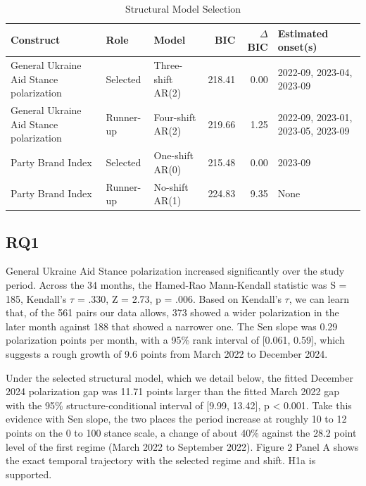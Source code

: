 \begin{table}[htbp]
\centering
\small
\begin{threeparttable}
\caption{Structural Model Selection}
\label{tab:5}
\begin{tabularx}{\textwidth}{@{}L{1.15}L{0.60}L{0.90}rrL{1.05}@{}}
\toprule
\textbf{Construct} & \textbf{Role} & \textbf{Model} & \textbf{BIC} & \textbf{$\Delta$BIC} & \textbf{Estimated onset(s)} \\
\midrule
General Ukraine Aid Stance polarization & Selected & Three-shift AR(2) & 218.41 & 0.00 & 2022-09, 2023-04, 2023-09 \\
General Ukraine Aid Stance polarization & Runner-up & Four-shift AR(2) & 219.66 & 1.25 & 2022-09, 2023-01, 2023-05, 2023-09 \\
Party Brand Index & Selected & One-shift AR(0) & 215.48 & 0.00 & 2023-09 \\
Party Brand Index & Runner-up & No-shift AR(1) & 224.83 & 9.35 & None \\
\bottomrule
\end{tabularx}
\end{threeparttable}
\end{table}


\subsection{RQ1}

General Ukraine Aid Stance polarization increased significantly over the study period. Across the 34 months, the Hamed-Rao Mann-Kendall statistic was S = 185, Kendall's $\tau$ = .330, Z = 2.73, p = .006. Based on Kendall's $\tau$, we can learn that, of the 561 pairs our data allows, 373 showed a wider polarization in the later month against 188 that showed a narrower one. The Sen slope was 0.29 polarization points per month, with a 95\% rank interval of [0.061, 0.59], which suggests a rough growth of 9.6 points from March 2022 to December 2024.

Under the selected structural model, which we detail below, the fitted December 2024 polarization gap was 11.71 points larger than the fitted March 2022 gap with the 95\% structure-conditional interval of [9.99, 13.42], p < 0.001. Take this evidence with Sen slope, the two places the period increase at roughly 10 to 12 points on the 0 to 100 stance scale, a change of about 40\% against the 28.2 point level of the first regime (March 2022 to September 2022). Figure 2 Panel A shows the exact temporal trajectory with the selected regime and shift. H1a is supported.



